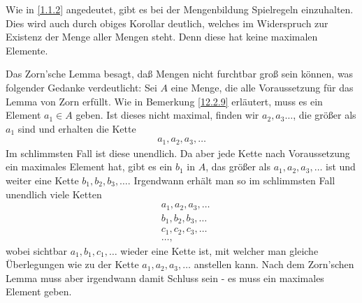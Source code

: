 \documentclass[../../main.tex]{subfiles}
\begin{document}
\begin{bem}\label{12.2.12}
	Wie in \ref{1.1.2} angedeutet, gibt es bei der Mengenbildung Spielregeln einzuhalten. Dies wird auch durch obiges Korollar deutlich, welches im Widerspruch zur Existenz der Menge aller Mengen steht. Denn diese hat keine maximalen Elemente.
\end{bem}

\begin{ans}
	Das Zorn'sche Lemma besagt, daß Mengen nicht furchtbar groß sein können, was folgender Gedanke verdeutlicht: Sei $A$ eine Menge, die alle Voraussetzung für das Lemma von Zorn erfüllt. Wie in Bemerkung \ref{12.2.9} erläutert, muss es ein Element $a_1\in A$ geben. Ist dieses nicht maximal, finden wir $a_2,a_3\ldots $, die größer als $a_1$ sind und erhalten die Kette
	\begin{align*}
		a_1,a_2,a_3,\ldots 
	\end{align*}
	Im schlimmsten Fall ist diese unendlich. Da aber jede Kette nach Voraussetzung ein maximales Element hat, gibt es ein $b_1$ in $A$, das größer als $a_1,a_2,a_3,\ldots $ ist und weiter eine Kette $b_1,b_2,b_3,\ldots $. Irgendwann erhält man so im schlimmsten Fall unendlich viele Ketten
	\begin{align*}
		&a_1,a_2,a_3,\ldots \\
		&b_1,b_2,b_3,\ldots \\
		&c_1,c_2,c_3,\ldots \\
		&\ldots ,
	\end{align*}
	wobei sichtbar $a_1,b_1,c_1,\ldots $ wieder eine Kette ist, mit welcher man gleiche Überlegungen wie zu der Kette $a_1,a_2,a_3,\ldots $ anstellen kann. Nach dem Zorn'schen Lemma muss aber irgendwann damit Schluss sein - es muss ein maximales Element geben.
\end{ans}
\end{document}

